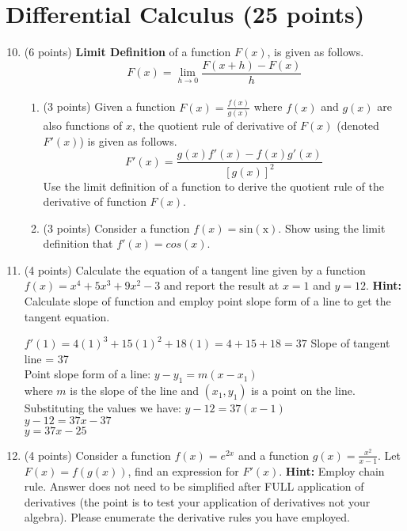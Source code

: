 \documentclass{article}%
\begin{document}
\section*{Differential Calculus (25 points)}
\begin{enumerate}
    \setcounter{enumi}{9}
    \item (6 points) \textbf{Limit Definition} of a function $F(x)$, is given as follows.
    \begin{equation*}
        F(x) = \lim\limits_{h\xrightarrow[]{} 0}\frac{F(x+h) - F(x)}{h}
    \end{equation*}
    \begin{enumerate}
    \item (3 points) Given a function $F(x) = \frac{f(x)}{g(x)}$ where $f(x)$ and $g(x)$ are also functions of $x$, the quotient rule of derivative of $F(x)$ (denoted $F'(x)$) is given as follows. 
    \begin{equation*}
        F'(x) = \frac{g(x)f'(x) - f(x)g'(x)}{[g(x)]^2}
    \end{equation*}
    Use the limit definition of a function to derive the quotient rule of the derivative of function $F(x)$.\vspace{2ex}
    \item (3 points) Consider a function $f(x) = \mathrm{sin(x)}$. Show using the limit definition that $f'(x)= cos(x)$.
\end{enumerate}

\item (4 points) Calculate the equation of a tangent line given by a function $f(x) = x^4 + 5x^3+9x^2-3$ and report the result at $x=1$ and $y = 12$. \textbf{Hint:} Calculate slope of function and employ point slope form of a line to get the tangent equation.

$f'(1) = 4(1)^3 +15(1)^2 +18(1)=4+15+18=37$
Slope of tangent line = 37\\
Point slope form of a line: $y-y_1=m(x-x_1)$\\
where $m$ is the slope of the line and $(x_1,y_1)$ is a point on the line.\\
Substituting the values we have: $y-12=37(x-1)$\\
$y-12=37x-37$\\
$y=37x-25$

\item (4 points) Consider a function $f(x) = e^{2x}$ and a function $g(x) = \frac{x^2}{x-1}$. Let $F(x) = f(g(x))$, find an expression for $F'(x)$. \textbf{Hint:} Employ chain rule. Answer does not need to be simplified after FULL application of derivatives (the point is to test your application of derivatives not your algebra). Please enumerate the derivative rules you have employed.


\end{enumerate}
\end{document}
